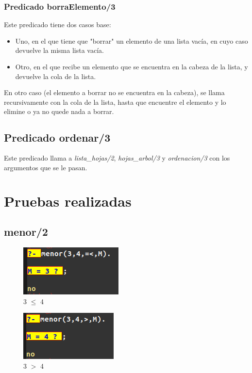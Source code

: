 \documentclass[12pt, a4paper, spanish]{article}
\begin{document}
\subsubsection{Predicado borraElemento/3}


Este predicado tiene dos casos base:

\begin{itemize}
	\item Uno, en el que tiene que "borrar" un elemento de una lista vacía, en cuyo caso devuelve la misma lista vacía.
	
	\item Otro, en el que recibe un elemento que se encuentra en la cabeza de la lista, y devuelve la cola de la lista.
\end{itemize}

En otro caso (el elemento a borrar no se encuentra en la cabeza), se llama recursivamente con la cola de la lista, hasta que encuentre el elemento y lo elimine o ya no quede nada a borrar.

\subsection{Predicado ordenar/3}


Este predicado llama a \textit{lista\_hojas/2}, \textit{hojas\_arbol/3} y \textit{ordenacion/3} con los argumentos que se le pasan.
\newpage

\section{Pruebas realizadas}
\subsection{menor/2}
\begin{multicols}{2}
	\begin{figure}[H]
		\centering
		\includegraphics{images/menor1.png}
		\caption{3 $\leq$ 4}
	\end{figure}
	\begin{figure}[H]
		\includegraphics{images/menor2.png}
		\caption{3 $>$ 4}
	\end{figure}
\end{multicols}
\end{document}
